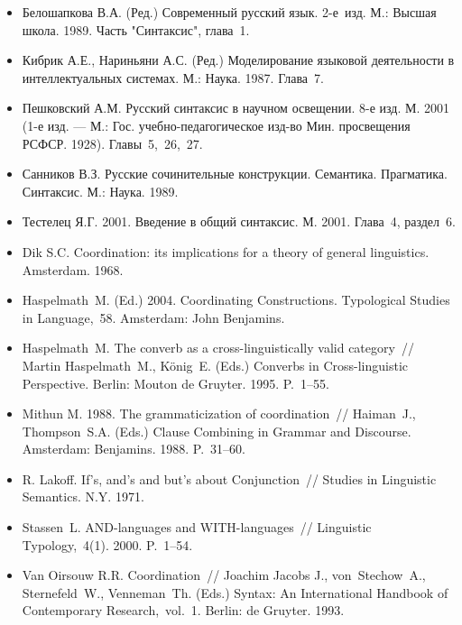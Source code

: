 \begin{itemize}
\item
  Белошапкова В.А. (Ред.) Современный русский язык. 2-е~изд. М.: Высшая
  школа. 1989. Часть "Синтаксис", глава~1.
\item
  Кибрик А.Е., Нариньяни А.С. (Ред.) Моделирование языковой деятельности
  в интеллектуальных системах. М.: Наука. 1987. Глава~7.
\item
  Пешковский А.М. Русский синтаксис в научном освещении. 8-е изд. М.
  2001 (1-е изд. --- М.: Гос. учебно-педагогическое изд-во Мин.
  просвещения РСФСР. 1928). Главы~5,~26,~27.
\item
  Санников В.З. Русские сочинительные конструкции. Семантика.
  Прагматика. Синтаксис. М.: Наука. 1989.
\item
  Тестелец Я.Г. 2001. Введение в общий синтаксис. М. 2001. Глава~4,
  раздел~6.
\item
  Dik S.C. Coordination: its implications for a theory of general
  linguistics. Amsterdam. 1968.
\item
  Haspelmath~M. (Ed.) 2004. Coordinating Constructions. Typological
  Studies in Language,~58. Amsterdam: John Benjamins.
\item
  Haspelmath~M. The converb as a cross-linguistically valid category~//
  Martin Haspelmath~M., König~E. (Eds.) Converbs in Cross-linguistic
  Perspective. Berlin: Mouton de Gruyter. 1995. P.~1--55.
\item
  Mithun M. 1988. The grammaticization of coordination~// Haiman~J.,
  Thompson~S.A. (Eds.) Clause Combining in Grammar and Discourse.
  Amsterdam: Benjamins. 1988. P.~31--60.
\item
  R. Lakoff. If's, and's and but's about Conjunction~// Studies in
  Linguistic Semantics. N.Y. 1971.
\item
  Stassen~L. AND-languages and WITH-languages~// Linguistic
  Typology,~4(1). 2000. P.~1--54.
\item
  Van Oirsouw R.R. Coordination~// Joachim Jacobs J., von~Stechow~A.,
  Sternefeld~W., Venneman~Th. (Eds.) Syntax: An International Handbook
  of Contemporary Research,~vol.~1. Berlin: de Gruyter. 1993.
\end{itemize}
